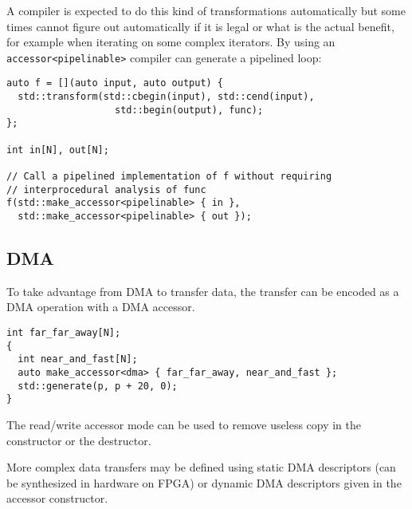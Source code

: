 \documentclass[a4paper]{article}
\begin{document}
A compiler is expected to do this kind of transformations
automatically but some times cannot figure out automatically if it is
legal or what is the actual benefit, for example when iterating on
some complex iterators. By using an \lstinline|accessor<pipelinable>|
compiler can generate a pipelined loop:
\begin{lstlisting}
auto f = [](auto input, auto output) {
  std::transform(std::cbegin(input), std::cend(input),
                   std::begin(output), func);
};

int in[N], out[N];

// Call a pipelined implementation of f without requiring
// interprocedural analysis of func
f(std::make_accessor<pipelinable> { in },
  std::make_accessor<pipelinable> { out });
\end{lstlisting}


\subsection{DMA}
\label{sec:dma}

To take advantage from DMA to transfer data, the transfer can be
encoded as a DMA operation with a DMA accessor.

\begin{lstlisting}
int far_far_away[N];
{
  int near_and_fast[N];
  auto make_accessor<dma> { far_far_away, near_and_fast };
  std::generate(p, p + 20, 0);
}
\end{lstlisting}

The read/write accessor mode can be used to remove useless copy in the
constructor or the destructor.

More complex data transfers may be defined using static DMA
descriptors (can be synthesized in hardware on FPGA) or dynamic DMA
descriptors given in the accessor constructor.




\end{document}
